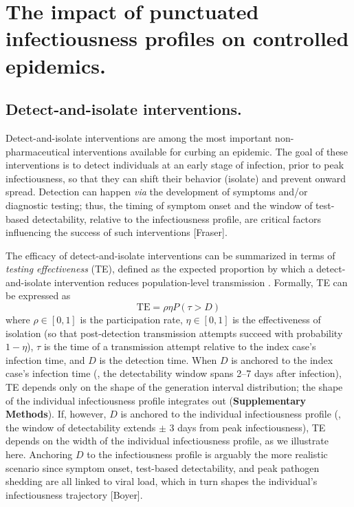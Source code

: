 \section{The impact of punctuated infectiousness profiles on controlled epidemics.}

\subsection{Detect-and-isolate interventions.}

Detect-and-isolate interventions are among the most important non-pharmaceutical interventions available for curbing an epidemic. The goal of these interventions is to detect individuals at an early stage of infection, prior to peak infectiousness, so that they can shift their behavior (isolate) and prevent onward spread. Detection can happen {\it via} the development of symptoms and/or diagnostic testing; thus, the timing of symptom onset and the window of test-based detectability, relative to the infectiousness profile, are critical factors influencing the success of such interventions [Fraser]. 

The efficacy of detect-and-isolate interventions can be summarized in terms of {\it testing effectiveness} (TE), defined as the expected proportion by which a detect-and-isolate intervention reduces population-level transmission  \citep{middleton_modeling_2024}. Formally, TE can be expressed as 
\begin{equation}
	\text{TE} = \rho \eta P(\tau > D)
\end{equation}
where $\rho \in [0,1]$ is the participation rate, $\eta \in [0,1]$ is the effectiveness of isolation (so that post-detection transmission attempts succeed with probability $1 - \eta$), $\tau$ is the time of a transmission attempt relative to the index case's infection time, and $D$ is the detection time. When $D$ is anchored to the index case's infection time (\eg, the detectability window spans 2--7 days after infection), TE depends only on the shape of the generation interval distribution; the shape of the individual infectiousness profile integrates out ({\bf Supplementary Methods}). If, however, $D$ is anchored to the individual infectiousness profile (\eg, the window of detectability extends $\pm$ 3 days from peak infectiousness), TE depends on the width of the individual infectiousness profile, as we illustrate here. Anchoring $D$ to the infectiousness profile is arguably the more realistic scenario since symptom onset, test-based detectability, and peak pathogen shedding are all linked to viral load, which in turn shapes the individual's infectiousness trajectory [Boyer]. 

